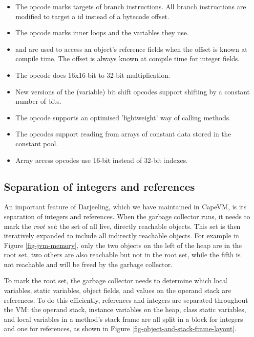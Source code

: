 \begin{itemize}
    \item The  opcode marks targets of branch instructions. All branch instructions are modified to target a  id instead of a bytecode offset.
    \item The  opcode marks inner loops and the variables they use.
    \item {} and  are used to access an object's reference fields when the offset is known at compile time. The offset is always known at compile time for integer fields.
    \item The  opcode does 16x16-bit to 32-bit multiplication.
    \item New  versions of the (variable) bit shift opcodes support shifting by a constant number of bits.
    \item The  opcode supports an optimised 'lightweight' way of calling methods.
    \item The  opcodes support reading from arrays of constant data stored in the constant pool.
    \item Array access opcodes use 16-bit instead of 32-bit indexes.
\end{itemize}


\subsection{Separation of integers and references}
\label{sec-darjeeling-split-architecure}

An important feature of Darjeeling, which we have maintained in CapeVM, is its separation of integers and references. When the garbage collector runs, it needs to mark the \emph{root set}: the set of all live, directly reachable objects. This set is then iteratively expanded to include all indirectly reachable objects. For example in Figure \ref{fig-jvm-memory}, only the two objects on the left of the heap are in the root set, two others are also reachable but not in the root set, while the fifth is not reachable and will be freed by the garbage collector.

To mark the root set, the garbage collector needs to determine which local variables, static variables, object fields, and values on the operand stack are references. To do this efficiently, references and integers are separated throughout the VM: the operand stack, instance variables on the heap, class static variables, and local variables in a method's stack frame are all split in a block for integers and one for references, as shown in Figure \ref{fig-object-and-stack-frame-layout}.

